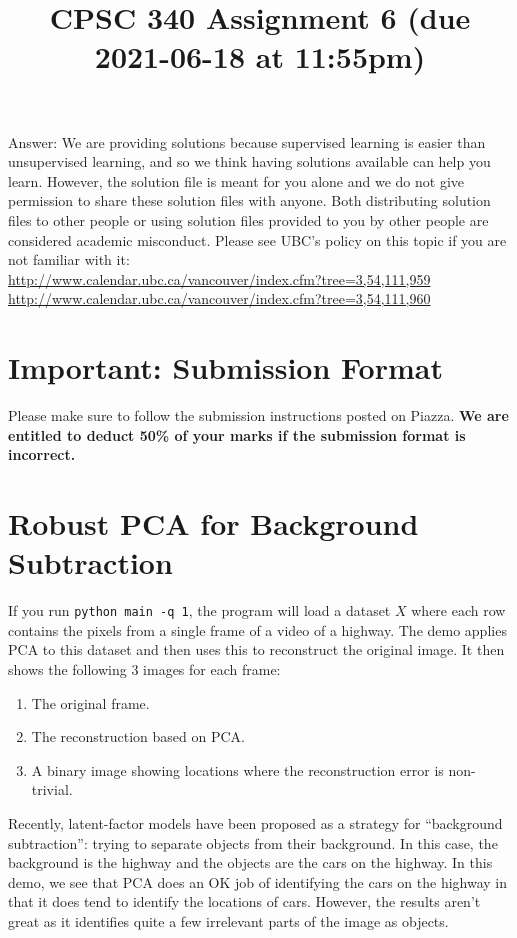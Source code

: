 \documentclass{article}
\def\ans#1{\par\gre{Answer: #1}}
\def\gre#1{{\color{gre}#1}}
\def\red#1{{\color{red}#1}}
\def\enum#1{\begin{enumerate}#1\end{enumerate}}
\begin{document}
\title{CPSC 340 Assignment 6 (due 2021-06-18 at 11:55pm)}
\date{}
\maketitle

\vspace{-7em}

\ans{
\red{We are providing solutions because supervised learning is easier than unsupervised learning, and so we think having solutions available can help you learn. However, the solution file is meant for you alone and we do not give permission to share these solution files with anyone. Both distributing solution files to other people or using solution files provided to you by other people are considered academic misconduct. Please see UBC's policy on this topic if you are not familiar with it:\\
\url{http://www.calendar.ubc.ca/vancouver/index.cfm?tree=3,54,111,959}\\
\url{http://www.calendar.ubc.ca/vancouver/index.cfm?tree=3,54,111,960}}
}

\section*{Important: Submission Format}

Please make sure to follow the submission instructions posted on Piazza. \textbf{We are entitled to deduct 50\% of your marks if the submission format is incorrect.}

\section{Robust PCA for Background Subtraction}

If you run \verb|python main -q 1|, the program will load a dataset $X$ where each row contains the pixels from a single frame of a video of a highway. The demo applies PCA to this dataset and then uses this to reconstruct the original image.
It then shows the following 3 images for each frame:
\enum{
	\item The original frame.
	\item The reconstruction based on PCA.
	\item A binary image showing locations where the reconstruction error is non-trivial.
}
Recently, latent-factor models have been proposed as a strategy for ``background subtraction'': trying to separate objects from their background. In this case, the background is the highway and the objects are the cars on the highway. In this demo, we see that PCA does an OK job of identifying the cars on the highway in that it does tend to identify the locations of cars. However, the results aren't great as it identifies quite a few irrelevant parts of the image as objects.
\end{document}
